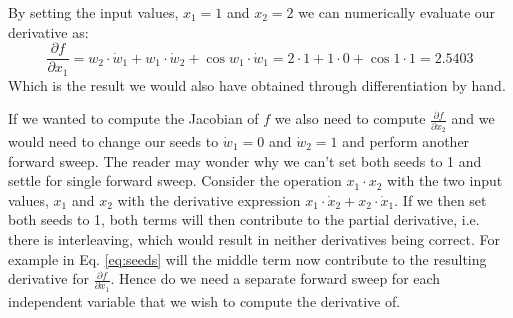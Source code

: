 	By setting the input values, $x_1 = 1$ and $x_2 = 2$ we can numerically evaluate
	our derivative as:
	\begin{equation}
	\frac{\partial f}{\partial x_1} = w_2 \cdot \dot{w}_1 + w_1 \cdot \dot{w}_2 +
	\cos w_1  \cdot  \dot{w}_1 =  2 \cdot 1 + 1 \cdot 0 + \cos 1 \cdot 1 = 2.5403
	\label{eq:seeds}
	\end{equation} 
	Which is the result we would also have obtained through differentiation by hand.
	
	If we wanted to compute the Jacobian of $f$ we also need to compute
	$\frac{\partial f}{\partial x_2}$  
	and we would need to change our seeds to $\dot{w}_1 = 0$ and $\dot{w}_2 = 1$ 
	and perform another forward sweep. 
	The reader may wonder why we can't set both seeds to 1 and settle for single
	forward sweep. 
	Consider the operation $x_1 \cdot x_2$ with the two input values, $x_1$ and
	$x_2$ with the derivative expression
	$x_1 \cdot \dot{x}_2 + x_2 \cdot \dot{x}_1$. If we then set both seeds to 1,
	both terms will then contribute to 
	the partial derivative, i.e. there is interleaving, which would result in
	neither derivatives being correct. For example in Eq. \ref{eq:seeds}
	will the middle term now contribute to the resulting derivative for
	$\frac{\partial f}{\partial x_1}$. Hence do we need a separate forward sweep for
	each
	independent variable that we wish to compute the derivative of. 
